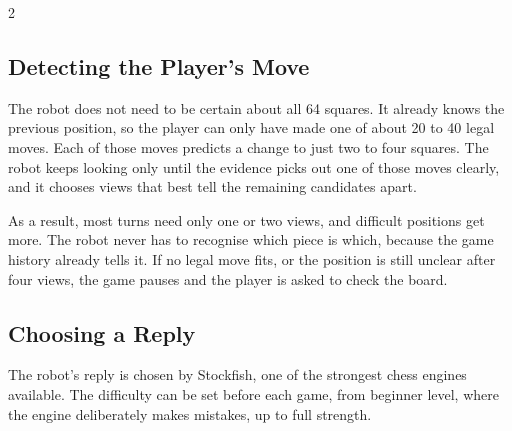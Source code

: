 \documentclass[10pt,a4paper]{article}
\newcommand{\bt}[2]{\textbf{#1}\\[-1pt]{\scriptsize\color{grey}#2}}
\begin{document}
\begin{multicols}{2}
\begin{center}
\label{fig:vision}
\end{center}

\subsection{Detecting the Player's Move}
The robot does not need to be certain about all 64 squares. It already knows the previous
position, so the player can only have made one of about 20 to 40 legal moves. Each of those
moves predicts a change to just two to four squares. The robot keeps looking only until the
evidence picks out one of those moves clearly, and it chooses views that best tell the remaining
candidates apart.

As a result, most turns need only one or two views, and difficult positions get more. The robot
never has to recognise which piece is which, because the game history already tells it.
If no legal move fits, or the position is still unclear after four views, the game pauses
and the player is asked to check the board.

\subsection{Choosing a Reply}
The robot's reply is chosen by Stockfish, one of the strongest chess engines available.
The difficulty can be set before each game, from beginner level, where the engine
deliberately makes mistakes, up to full strength.


\end{multicols}
\end{document}
